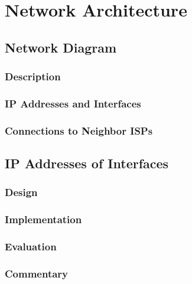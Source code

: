 \chapter{Network Architecture}
\label{chap:architecture}

\section{Network Diagram}

\subsection{Description}

\subsection{IP Addresses and Interfaces}

\subsection{Connections to Neighbor ISPs}



\section{IP Addresses of Interfaces}

\subsection{Design}

\subsection{Implementation}

\subsection{Evaluation}

\subsection{Commentary}

